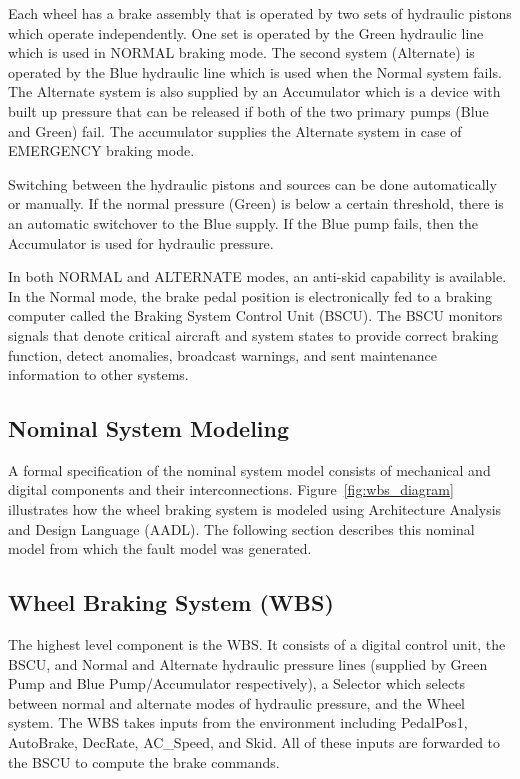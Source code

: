 Each wheel has a brake assembly that is operated by two sets of hydraulic pistons which operate independently. One set is operated by the Green hydraulic line which is used in NORMAL braking mode. The second system (Alternate) is operated by the Blue hydraulic line which is used when the Normal system fails. The Alternate system is also supplied by an Accumulator which is a device with built up pressure that can be released if both of the two primary pumps (Blue and Green) fail. The accumulator supplies the Alternate system in case of EMERGENCY braking mode. 

Switching between the hydraulic pistons and sources can be done automatically or manually. If the normal pressure (Green) is below a certain threshold, there is an automatic switchover to the Blue supply. If the Blue pump fails, then the Accumulator is used for hydraulic pressure. 

In both NORMAL and ALTERNATE modes, an anti-skid capability is available. In the Normal mode, the brake pedal position is electronically fed to a braking computer called the Braking System Control Unit (BSCU). The BSCU monitors signals that denote critical aircraft and system states to provide correct braking function, detect anomalies, broadcast warnings, and sent maintenance information to other systems. 

\subsection{Nominal System Modeling}
A formal specification of the nominal system model consists of mechanical and digital components and their interconnections. Figure~\ref{fig:wbs_diagram} illustrates how the wheel braking system is modeled using Architecture Analysis and Design Language (AADL). The following section describes this nominal model from which the fault model was generated. 

\subsection{Wheel Braking System (WBS)}
The highest level component is the WBS. It consists of a digital control unit, the BSCU, and Normal and Alternate hydraulic pressure lines (supplied by Green Pump and Blue Pump/Accumulator respectively), a Selector which selects between normal and alternate modes of hydraulic pressure, and the Wheel system. The WBS takes inputs from the environment including PedalPos1, AutoBrake, DecRate, AC\_Speed, and Skid. All of these inputs are forwarded to the BSCU to compute the brake commands.

